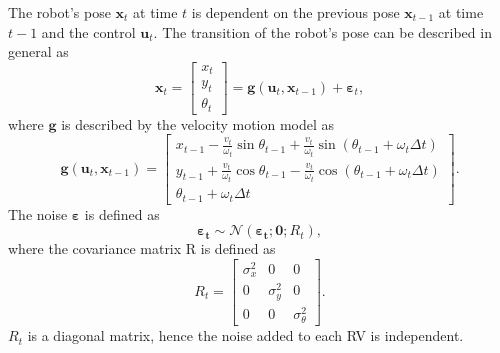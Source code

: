 \documentclass[12pt,oneside,openany,a4paper, %
afrikaans,english,
]{memoir}
\numberwithin{equation}{chapter}
\begin{document}
The robot's pose $\bm{x}_t$ at time $t$ is dependent on the previous pose $\bm{x}_{t-1}$ at time $t-1$ and the control $\bm{u}_t$. The transition of the robot's pose can be described in general as
\begin{equation}\label{eq:stateTranGen}
\bm{x}_t =
\begin{bmatrix}
x_t\\
y_t\\
\theta_t
\end{bmatrix}
= \bm{g}(\bm{u}_t, \bm{x}_{t-1}) + \bm{\varepsilon}_t,
\end{equation}
where $\bm{g}$ is described by the velocity motion model as
\begin{equation}
\bm{g}(\bm{u}_t, \bm{x}_{t-1})=
\begin{bmatrix}
x_{t-1} - \frac{v_t}{\omega_t} \sin\theta_{t-1} + \frac{v_t}{\omega_t} \sin(\theta_{t-1} + \omega_t \Delta t)\\
y_{t-1} + \frac{v_t}{\omega_t} \cos\theta_{t-1} - \frac{v_t}{\omega_t} \cos(\theta_{t-1} + \omega_t \Delta t)\\
\theta_{t-1} + \omega_t \Delta t
\end{bmatrix}.
\end{equation}
The noise $\bm{\varepsilon}$ is defined as
\begin{equation}
\bm{\varepsilon_t} \sim \mathcal{N}(\bm{\varepsilon_t}; \bm{0}; R_t),
\end{equation}
where the covariance matrix R is defined as
\begin{equation}
R_t =
\begin{bmatrix}
\sigma_x^2 & 0 & 0\\
0 & \sigma_y^2 & 0\\
0 & 0 & \sigma_\theta^2
\end{bmatrix}.
\end{equation}
$R_t$ is a diagonal matrix, hence the noise added to each RV is independent.
\end{document}
